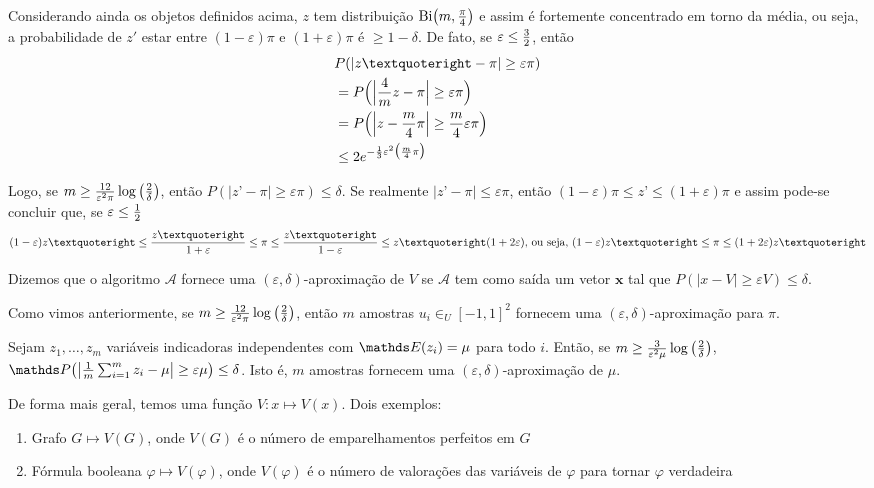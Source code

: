 Considerando ainda os objetos definidos acima, $z$ tem distribuição $\mathrm{Bi}\big(m, {\pi \over 4}\big)$ e assim é fortemente concentrado em torno da média, ou seja, a probabilidade de $z'$ estar entre $(1-\varepsilon)\pi$ e $(1+\varepsilon)\pi$ é $\geq 1- \delta$. De fato, se $\varepsilon \leq {3 \over 2}$, então
\begin{align*}
  &P( | z’ - \pi | \geq \varepsilon \pi) \\
      &= P\Big(\Big| {4 \over m}z - \pi \Big| \geq \varepsilon \pi\Big) \\
      &= P\Big(\Big| z - {m \over 4}\pi \Big| \geq {m \over 4} \varepsilon \pi\Big) \\
      &\leq 2e^{- {1 \over 3} \varepsilon^2\big({m \over 4}\pi\big)}
\end{align*}

Logo, se $m \geq {12 \over \varepsilon^2 \pi} \log \big({2 \over \delta}\big)$, então $P( | z’ - \pi | \geq \varepsilon \pi) \leq \delta$. Se realmente $|z’-\pi| \leq \varepsilon \pi$, então $(1-\varepsilon)\pi \leq z’ \leq (1+\varepsilon)\pi$ e assim pode-se concluir que, se $\varepsilon \leq {1 \over 2}$
$$(1-\varepsilon)z’ \leq {z’ \over 1 + \varepsilon} \leq \pi \leq {z’ \over 1 - \varepsilon} \leq z’(1+2\varepsilon) \text{, ou seja, } (1-\varepsilon)z’ \leq \pi \leq (1+2\varepsilon)z’$$

\begin{definicao}
Dizemos que o algoritmo $\mathscr{A}$ fornece uma $(\varepsilon, \delta)$-aproximação de $V$ se $\mathscr{A}$ tem como saída um vetor $\mathbf{x}$ tal que $P(|x - V| \geq \varepsilon V) \leq \delta$.
\end{definicao}

Como vimos anteriormente, se $m \geq {12 \over \varepsilon^2 \pi} \log \big({2 \over \delta}\big)$, então $m$ amostras $u_i \in_U [-1, 1]^2$ fornecem uma $(\varepsilon, \delta)$-aproximação para $\pi$.

\begin{teorema}
\label{teorema:edaproximacao}
Sejam $z_1, \dots, z_m$ variáveis indicadoras independentes com $\EE(z_i) = \mu$ para todo $i$. Então, se $m \geq {3 \over \varepsilon^2 \mu} \log \big({2 \over \delta}\big)$, $\PP\big(\big|{1\over m} \sum_{i = 1}^m z_i - \mu\big| \geq \varepsilon \mu\big) \leq \delta$. Isto é, $m$ amostras fornecem uma $(\varepsilon, \delta)$-aproximação de $\mu$.
\end{teorema}

De forma mais geral, temos uma função $V: x \mapsto V(x)$. Dois exemplos:
\begin{enumerate}
\item Grafo $G \mapsto V(G)$, onde $V(G)$ é o número de emparelhamentos perfeitos em $G$
\item Fórmula booleana $\varphi \mapsto V(\varphi)$, onde $V(\varphi)$ é o número de valorações das variáveis de $\varphi$ para tornar $\varphi$ verdadeira
\end{enumerate}

